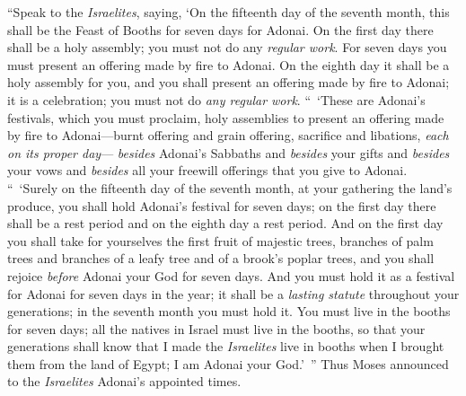 \begin{biblechapter}
\verse “Speak to the \textit{Israelites}, saying, ‘On the fifteenth day of the seventh month, this shall be the Feast of Booths for seven days for Adonai.
\verse On the first day there shall be a holy assembly; you must not do any \textit{regular work}.
\verse For seven days you must present an offering made by fire to Adonai. On the eighth day it shall be a holy assembly for you, and you shall present an offering made by fire to Adonai; it is a celebration; you must not do \textit{any regular work}.
 “ ‘These are Adonai’s festivals, which you must proclaim, holy assemblies to present an offering made by fire to Adonai—burnt offering and grain offering, sacrifice and libations, \textit{each on its proper day}—
\verse \textit{besides} Adonai’s Sabbaths and \textit{besides} your gifts and \textit{besides} your vows and \textit{besides} all your freewill offerings that you give to Adonai.
\verse “ ‘Surely on the fifteenth day of the seventh month, at your gathering the land’s produce, you shall hold Adonai’s festival for seven days; on the first day there shall be a rest period and on the eighth day a rest period.
\verse And on the first day you shall take for yourselves the first fruit of majestic trees, branches of palm trees and branches of a leafy tree and of a brook’s poplar trees, and you shall rejoice \textit{before} Adonai your God for seven days.
\verse And you must hold it as a festival for Adonai for seven days in the year; it shall be a \textit{lasting statute} throughout your generations; in the seventh month you must hold it.
\verse You must live in the booths for seven days; all the natives in Israel must live in the booths,
\verse so that your generations shall know that I made the \textit{Israelites} live in booths when I brought them from the land of Egypt; I am Adonai your God.’ ”
\verse Thus Moses announced to the \textit{Israelites} Adonai’s appointed times.
\end{biblechapter}

